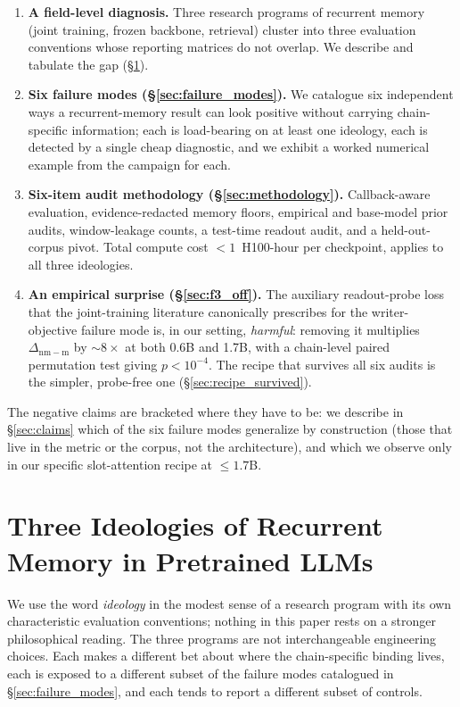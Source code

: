 \documentclass{article}
\newcommand{\dnm}{\Delta_{\mathrm{nm-m}}}
\begin{document}
\begin{enumerate}\setlength{\itemsep}{0.5pt}
\item \textbf{A field-level diagnosis.}  Three research programs of
recurrent memory (joint training, frozen backbone, retrieval) cluster
into three evaluation conventions whose reporting matrices do not
overlap.  We describe and tabulate the gap (\S\ref{sec:ideologies}).
\item \textbf{Six failure modes (\S\ref{sec:failure_modes}).}  We
catalogue six independent ways a recurrent-memory result can look
positive without carrying chain-specific information; each is
load-bearing on at least one ideology, each is detected by a single
cheap diagnostic, and we exhibit a worked numerical example from the
campaign for each.
\item \textbf{Six-item audit methodology (\S\ref{sec:methodology}).}
Callback-aware evaluation, evidence-redacted memory floors, empirical
and base-model prior audits, window-leakage counts, a test-time
readout audit, and a held-out-corpus pivot.  Total compute cost
$<\!1$~H100-hour per checkpoint, applies to all three ideologies.
\item \textbf{An empirical surprise (\S\ref{sec:f3_off}).}  The
auxiliary readout-probe loss that the joint-training literature
canonically prescribes for the writer-objective failure mode is, in
our setting, \emph{harmful}: removing it multiplies $\dnm$ by
$\sim\!8\times$ at both 0.6B and 1.7B, with a chain-level paired
permutation test giving $p < 10^{-4}$.  The recipe that survives all
six audits is the simpler, probe-free one
(\S\ref{sec:recipe_survived}).
\end{enumerate}

The negative claims are bracketed where they have to be: we describe
in \S\ref{sec:claims} which of the six failure modes generalize by
construction (those that live in the metric or the corpus, not the
architecture), and which we observe only in our specific
slot-attention recipe at $\le 1.7$B.

\section{Three Ideologies of Recurrent Memory in Pretrained LLMs}
\label{sec:ideologies}

We use the word \emph{ideology} in the modest sense of a research
program with its own characteristic evaluation conventions; nothing
in this paper rests on a stronger philosophical reading.  The three
programs are not interchangeable engineering choices.  Each makes a
different bet about where the chain-specific binding lives, each is
exposed to a different subset of the failure modes catalogued in
\S\ref{sec:failure_modes}, and each tends to report a different
subset of controls.
\end{document}
